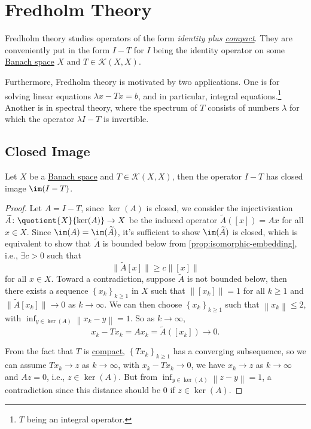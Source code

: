 \section{Fredholm Theory}
Fredholm theory studies operators of the form \emph{identity plus \hyperref[def:compact-op]{compact}}. They are conveniently put in the form \(I - T\) for \(I\) being the identity operator on some \hyperref[def:Banach-space]{Banach space} \(X\) and \(T\in \mathcal{K}(X, X)\).

Furthermore, Fredholm theory is motivated by two applications. One is for solving linear equations \(\lambda x - Tx = b\), and in particular, integral equations.\footnote{\(T\) being an integral operator.} Another is in spectral theory, where the spectrum of \(T\) consists of numbers \(\lambda \) for which the operator \(\lambda I - T\) is invertible.
\subsection{Closed Image}
\begin{lemma}\label{lma:lec19}
	Let \(X\) be a \hyperref[def:Banach-space]{Banach space} and \(T\in \mathcal{K}(X, X)\), then the operator \(I-T\) has closed image \(\im(I-T)\).
\end{lemma}
\begin{proof}
	Let \(A=I-T\), since \(\ker (A)\) is closed, we consider the injectivization \(\widetilde{A} \colon \quotient{X}{\ker(A)}\to X\) be the induced operator \(\widetilde{A} ([x])=Ax\) for all \(x\in X\). Since \(\im(A) = \im(\widetilde{A} )\), it's sufficient to show \(\im(\widetilde{A} )\) is closed, which is equivalent to show that \(\widetilde{A} \) is bounded below from \autoref{prop:isomorphic-embedding}, i.e., \(\exists c>0\) such that
	\[
		\lVert \widetilde{A} [x]\rVert \geq c\left\lVert [x]\right\rVert
	\]
	for all \(x\in X\). Toward a contradiction, suppose \(\widetilde{A} \) is not bounded below, then there exists a sequence \(\left\{ x_k \right\} _{k\geq 1}\) in \(X\) such that \(\left\lVert [x_{k} ]\right\rVert = 1\) for all \(k\geq 1\) and \(\lVert \widetilde{A} [x_k] \rVert \to 0\) as \(k \to \infty \). We can then choose \(\left\{ x_{k}  \right\}_{k\geq 1} \) such that \(\left\lVert x_{k} \right\rVert \leq 2\), with \(\inf_{y\in \ker(A)} \left\lVert x_{k} -y\right\rVert=1 \). So as \(k\to \infty \),
	\[
		x_{k} - Tx_{k} = Ax_{k} = \widetilde{A} ([x_{k} ])\to 0.
	\]

	From the fact that \(T\) is \hyperref[def:compact-op]{compact}, \(\left\{ Tx_{k}  \right\}_{k\geq 1} \) has a converging subsequence, so we can assume \(Tx_{k} \to z\) as \(k\to \infty \), with \(x_{k} - Tx_{k} \to 0\), we have \(x_{k} \to z\) as \(k \to \infty \) and \(Az = 0\), i.e., \(z\in \ker(A)\). But from \(\inf _{y\in \ker(A)} \left\lVert z - y\right\rVert = 1\), a contradiction since this distance should be \(0\) if \(z\in \ker(A)\).
\end{proof}

